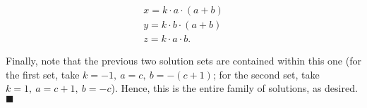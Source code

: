 \documentclass{ximera}
\begin{document}
$$ \begin{array}{l}
x = k \cdot a \cdot \left(a + b\right) \\
y = k \cdot b \cdot \left(a + b\right) \\
z = k \cdot a \cdot b.
\end{array} $$

\noindent Finally, note that the previous two solution sets are contained within this one (for the first set, take $k = -1, \ a = c, \ b = -\left(c+1\right)$; for the second set, take $k = 1, \ a = c+1, \ b= -c$).  Hence, this is the entire family of solutions, as desired.
\noindent   {} $\blacksquare$ \\
\end{document}
